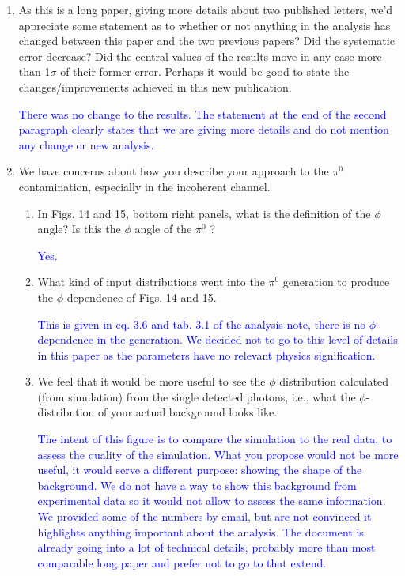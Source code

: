 \documentclass[a4paper,11pt,twoside]{article}
\begin{document}
\begin{enumerate}
\item  As this is a long paper, giving more details about two published letters, we'd appreciate some statement as
to whether or not anything in the analysis has changed between this paper and the two previous papers? Did
the systematic error decrease? Did the central values of the results move in any case more than 1$\sigma$ of their
former error. Perhaps it would be good to state the changes/improvements achieved in this new publication.

   \textcolor{blue}{There was no change to the results. The statement at the end of the second paragraph
clearly states that we are giving more details and do not mention any change or new analysis.}

\item  We have concerns about how you describe your approach to the $\pi^0$ contamination, especially in the incoherent
channel.
\begin{enumerate}
\item In Figs. 14 and 15, bottom right panels, what is the definition of the $\phi$ angle? Is this the $\phi$ angle of the
$\pi^0$ ?

   \textcolor{blue}{Yes.}

\item What kind of input distributions went into the $\pi^0$ generation to produce the $\phi$-dependence of Figs. 14
and 15.

   \textcolor{blue}{This is given in eq. 3.6 and tab. 3.1 of the analysis note, there is no $\phi$-dependence 
   in the generation. We decided not to go to this level 
   of details in this paper as the parameters have no relevant physics signification.}

\item We feel that it would be more useful to see the $\phi$ distribution calculated (from simulation) from the
single detected photons, i.e., what the $\phi$-distribution of your actual background looks like.

   \textcolor{blue}{The intent of this figure is to compare the simulation to the real data, to assess the 
quality of the simulation. What you propose would not be more useful, it would serve a different purpose:
showing the shape of the background. We do not have a way to show this background from experimental 
data so it would not allow to assess the same information. We provided some of the numbers by email, 
but are not convinced it highlights anything important about the analysis. The document is
already going into a lot of technical details, probably more than most comparable long paper and prefer not 
to go to that extend.}


\end{enumerate}
\end{enumerate}
\end{document}
